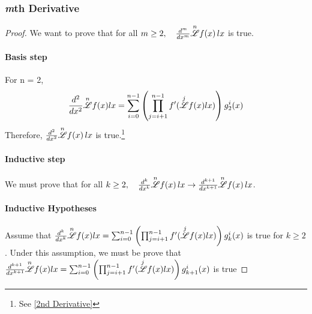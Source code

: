 \documentclass[12pt, letterpaper]{article}
\begin{document}
\subsubsection{\textit{m}th Derivative}
\begin{proof}
    We want to prove that for all $m \ge 2, \quad \frac{d^m}{dx^m}\overset{n}{\mathscr{L}} f(x) \, lx$  is true.

    \paragraph{Basis step}
    For n = 2, 
    \begin{align*}
        \frac{d^2}{dx^2}\overset{n}{\mathscr{L}} f(x) lx = \sum^{n-1}_{i=0}\left(\prod^{n-1}_{j=i+1}f'(\overset{j}{\mathscr{L}}f(x)lx)\right)g^i_2(x)\\
    \end{align*}
    Therefore, $\frac{d^2}{dx^2}\overset{n}{\mathscr{L}} f(x) \, lx$ is true.\footnote{See \ref{2nd Derivative}}

    \paragraph{Inductive step}

    We must prove that for all $k \ge 2, \quad \frac{d^k}{dx^k}\overset{n}{\mathscr{L}} f(x) \, lx \to \frac{d^{k+1}}{dx^{k+1}}\overset{n}{\mathscr{L}} f(x) \, lx$.

    \paragraph{Inductive Hypotheses}
    Assume that $\frac{d^k}{dx^k}\overset{n}{\mathscr{L}} f(x) lx = \sum^{n-1}_{i=0}\left(\prod^{n-1}_{j=i+1}f'(\overset{j}{\mathscr{L}}f(x)lx)\right)g^i_k(x)$ is true for $k \ge 2$.
    Under this assumption, we must be prove that $\frac{d^{k+1}}{dx^{k+1}}\overset{n}{\mathscr{L}} f(x) lx = \sum^{n-1}_{i=0}\left(\prod^{n-1}_{j=i+1}f'(\overset{j}{\mathscr{L}}f(x)lx)\right)g^i_{k+1}(x)$ is true


\end{proof}
\end{document}
